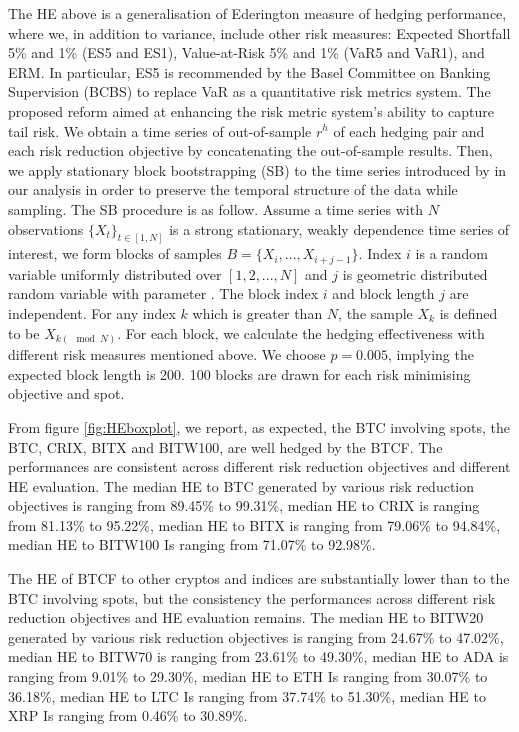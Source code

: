The HE above is a generalisation of Ederington measure of hedging performance, where we,
in addition to variance, include other risk measures: Expected Shortfall 5\% and 1\% (ES5 and ES1), Value-at-Risk 5\% and 1\% (VaR5 and VaR1), and ERM.
In particular, ES5 is recommended by the Basel Committee on Banking Supervision (BCBS) to replace VaR as a quantitative risk metrics system.
The proposed reform aimed at enhancing the risk metric system's ability to capture tail risk. \medskip
%
We obtain a time series of out-of-sample $r^h$ of each hedging pair and each risk reduction objective by concatenating the out-of-sample results.
Then, we apply stationary block bootstrapping (SB) to the time series introduced by \cite{Politis1994} in our analysis in order to preserve the temporal structure of the data while sampling.
The SB procedure is as follow.
Assume a time series with $N$ observations $\{X_t\}_{t \in [1,N]}$ is a strong stationary, weakly dependence time series of interest,
we form blocks of samples $B = \{X_i, ..., X_{i+j-1}\}$.
Index $i$ is a random variable uniformly distributed over $[1,2,...,N]$ and $j$ is geometric distributed random variable with parameter .
The block index $i$ and block length $j$ are independent.
For any index $k$ which is greater than $N$, the sample $X_k$ is defined to be $X_{k(\mod N)}$.
For each block, we calculate the hedging effectiveness with different risk measures mentioned above.
We choose $p=0.005$, implying the expected block length is 200.
100 blocks are drawn for each risk minimising objective and spot. \medskip

From figure \ref{fig:HEboxplot}, we report, as expected, the BTC involving spots, the BTC, CRIX, BITX and BITW100, are well hedged by the BTCF.
The performances are consistent across different risk reduction objectives and different HE evaluation.
The median HE to BTC generated by various risk reduction objectives is ranging from 89.45\% to 99.31\%, median HE to CRIX is ranging from 81.13\% to 95.22\%,
median HE to BITX is ranging from 79.06\% to 94.84\%, median HE to BITW100 Is ranging from 71.07\% to 92.98\%. \medskip

The HE of BTCF to other cryptos and indices are substantially lower than to the BTC involving spots, but the consistency the performances across different risk reduction objectives and HE evaluation remains.
The median HE to BITW20 generated by various risk reduction objectives is ranging from 24.67\% to 47.02\%, median HE to BITW70 is ranging from 23.61\% to 49.30\%,
median HE to ADA is ranging from 9.01\% to 29.30\%, median HE to ETH Is ranging from 30.07\% to 36.18\%, median HE to LTC Is ranging from 37.74\% to 51.30\%,
median HE to XRP Is ranging from 0.46\% to 30.89\%.



